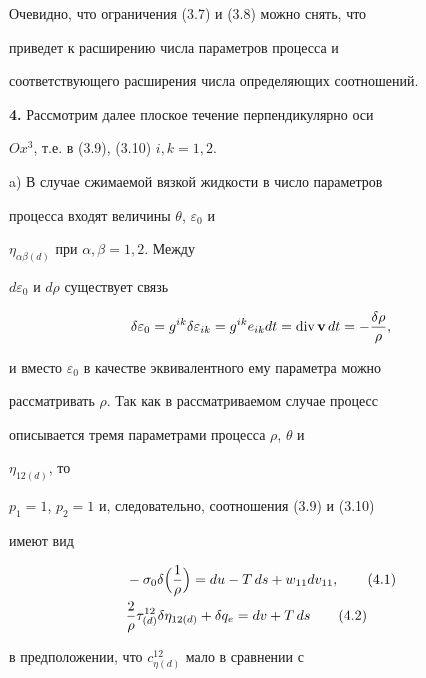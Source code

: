 Очевидно, что ограничения (3.7) и (3.8) можно снять, что


приведет к расширению числа параметров процесса и


соответствующего расширения числа определяющих соотношений.


\medskip





{\bf 4.} Рассмотрим далее плоское течение перпендикулярно оси


$Ox^3$, т.е. в (3.9), (3.10) $i,k=1,2$.


\medskip





a) В случае сжимаемой вязкой жидкости в число параметров


процесса входят величины $\theta$, $\varepsilon_0$ и


$\eta_{\alpha\beta(d)}$ при $\alpha,\beta=1,2$. Между


$d\varepsilon_0$ и $d\rho $ существует связь \cite{Sed}


$$


\delta\varepsilon_0=g^{ik}\delta\varepsilon_{ik}=g^{ik}e_{ik}dt=


\text{div}\,{\bold v}\,dt=-\frac{\delta\rho }{\rho },


$$


и вместо $\varepsilon_0$ в качестве эквивалентного ему параметра можно


рассматривать $\rho $. Так как в рассматриваемом случае процесс


описывается тремя параметрами процесса $\rho $, $\theta$ и


$\eta_{12(d)}$, то


$p_1=1$, $p_2=1$ и, следовательно, соотношения (3.9) и (3.10)


имеют вид


\begin{align}


&-\sigma_0\delta\Bigl(\frac{1}{\rho }\Bigr)=du-T\,ds+


w_{11}dv_{11},\tag{4.1}\\


&\frac{2}{\rho }\tau^{12}_{(d)}\delta\eta_{12(d)}+\delta q_e


=dv+T\,ds\tag{4.2}


\end{align}


в предположении, что $c^{12}_{\eta(d)}$ мало в сравнении с


